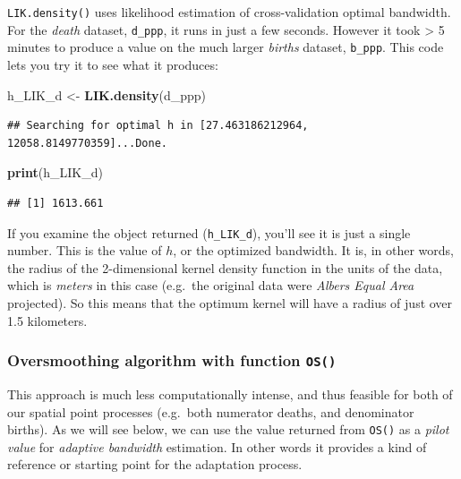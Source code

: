\documentclass[
]{book}
\newenvironment{Shaded}{\begin{snugshade}}{\end{snugshade}}
\newcommand{\FunctionTok}[1]{\textcolor[rgb]{0.13,0.29,0.53}{\textbf{#1}}}
\newcommand{\NormalTok}[1]{#1}
\newcommand{\OtherTok}[1]{\textcolor[rgb]{0.56,0.35,0.01}{#1}}
\begin{document}
\texttt{LIK.density()} uses likelihood estimation of cross-validation optimal bandwidth. For the \emph{death} dataset, \texttt{d\_ppp}, it runs in just a few seconds. However it took \textgreater{} 5 minutes to produce a value on the much larger \emph{births} dataset, \texttt{b\_ppp}. This code lets you try it to see what it produces:

\begin{Shaded}
\begin{Highlighting}[]
\NormalTok{h\_LIK\_d }\OtherTok{\textless{}{-}} \FunctionTok{LIK.density}\NormalTok{(d\_ppp)}
\end{Highlighting}
\end{Shaded}

\begin{verbatim}
## Searching for optimal h in [27.463186212964, 12058.8149770359]...Done.
\end{verbatim}

\begin{Shaded}
\begin{Highlighting}[]
\FunctionTok{print}\NormalTok{(h\_LIK\_d)}
\end{Highlighting}
\end{Shaded}

\begin{verbatim}
## [1] 1613.661
\end{verbatim}

If you examine the object returned (\texttt{h\_LIK\_d}), you'll see it is just a single number. This is the value of \(h\), or the optimized bandwidth. It is, in other words, the radius of the 2-dimensional kernel density function in the units of the data, which is \emph{meters} in this case (e.g.~the original data were \emph{Albers Equal Area} projected). So this means that the optimum kernel will have a radius of just over 1.5 kilometers.

\hypertarget{oversmoothing-algorithm-with-function-os}{%
\subsubsection{\texorpdfstring{Oversmoothing algorithm with function \texttt{OS()}}{Oversmoothing algorithm with function OS()}}\label{oversmoothing-algorithm-with-function-os}}

This approach is much less computationally intense, and thus feasible for both of our spatial point processes (e.g.~both numerator deaths, and denominator births). As we will see below, we can use the value returned from \texttt{OS()} as a \emph{pilot value} for \emph{adaptive bandwidth} estimation. In other words it provides a kind of reference or starting point for the adaptation process.
\end{document}
